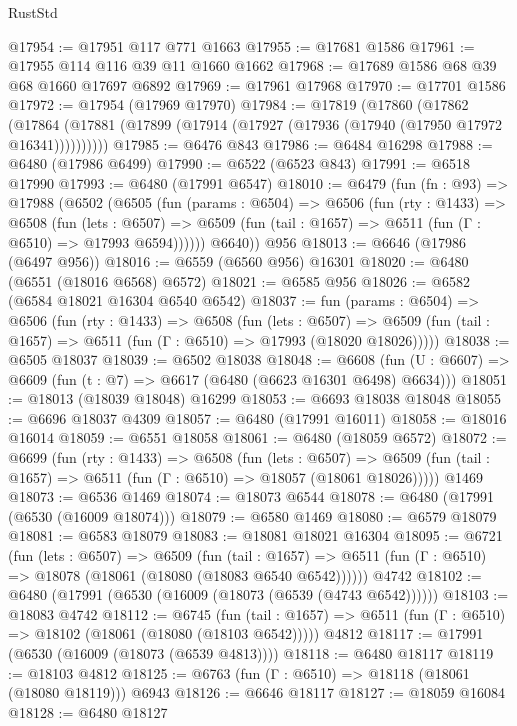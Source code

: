 \begin{lexlean}{RustStd}
\begin{coremodule}
@17954 := @17951 @117 @771 @1663
@17955 := @17681 @1586
@17961 := @17955 @114 @116 @39 @11 @1660 @1662
@17968 := @17689 @1586 @68 @39 @68 @1660 @17697 @6892
@17969 := @17961 @17968
@17970 := @17701 @1586
@17972 := @17954 (@17969 @17970)
@17984 := @17819
    (@17860
      (@17862
        (@17864 (@17881 (@17899 (@17914 (@17927 (@17936 (@17940 (@17950 @17972 @16341))))))))))
@17985 := @6476 @843
@17986 := @6484 @16298
@17988 := @6480 (@17986 @6499)
@17990 := @6522 (@6523 @843)
@17991 := @6518 @17990
@17993 := @6480 (@17991 @6547)
@18010 := @6479
    (fun (fn : @93) =>
    @17988
      (@6502
        (@6505
          (fun (params : @6504) =>
          @6506
            (fun (rty : @1433) =>
            @6508
              (fun (lets : @6507) =>
              @6509 (fun (tail : @1657) => @6511 (fun (Γ : @6510) => @17993 @6594))))))
        @6640))
    @956
@18013 := @6646 (@17986 (@6497 @956))
@18016 := @6559 (@6560 @956) @16301
@18020 := @6480 (@6551 (@18016 @6568) @6572)
@18021 := @6585 @956
@18026 := @6582 (@6584 @18021 @16304 @6540 @6542)
@18037 := fun (params : @6504) =>
  @6506
    (fun (rty : @1433) =>
    @6508
      (fun (lets : @6507) =>
      @6509 (fun (tail : @1657) => @6511 (fun (Γ : @6510) => @17993 (@18020 @18026)))))
@18038 := @6505 @18037
@18039 := @6502 @18038
@18048 := @6608
    (fun (U : @6607) => @6609 (fun (t : @7) => @6617 (@6480 (@6623 @16301 @6498) @6634)))
@18051 := @18013 (@18039 @18048) @16299
@18053 := @6693 @18038 @18048
@18055 := @6696 @18037 @4309
@18057 := @6480 (@17991 @16011)
@18058 := @18016 @16014
@18059 := @6551 @18058
@18061 := @6480 (@18059 @6572)
@18072 := @6699
    (fun (rty : @1433) =>
    @6508
      (fun (lets : @6507) =>
      @6509 (fun (tail : @1657) => @6511 (fun (Γ : @6510) => @18057 (@18061 @18026)))))
    @1469
@18073 := @6536 @1469
@18074 := @18073 @6544
@18078 := @6480 (@17991 (@6530 (@16009 @18074)))
@18079 := @6580 @1469
@18080 := @6579 @18079
@18081 := @6583 @18079
@18083 := @18081 @18021 @16304
@18095 := @6721
    (fun (lets : @6507) =>
    @6509
      (fun (tail : @1657) =>
      @6511 (fun (Γ : @6510) => @18078 (@18061 (@18080 (@18083 @6540 @6542))))))
    @4742
@18102 := @6480 (@17991 (@6530 (@16009 (@18073 (@6539 (@4743 @6542))))))
@18103 := @18083 @4742
@18112 := @6745
    (fun (tail : @1657) => @6511 (fun (Γ : @6510) => @18102 (@18061 (@18080 (@18103 @6542)))))
    @4812
@18117 := @17991 (@6530 (@16009 (@18073 (@6539 @4813))))
@18118 := @6480 @18117
@18119 := @18103 @4812
@18125 := @6763 (fun (Γ : @6510) => @18118 (@18061 (@18080 @18119))) @6943
@18126 := @6646 @18117
@18127 := @18059 @16084
@18128 := @6480 @18127

\end{coremodule}
\end{lexlean}
